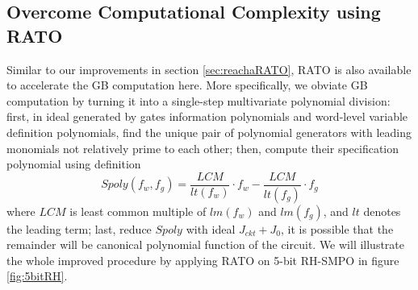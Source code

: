 \subsection{Overcome Computational Complexity using RATO}
Similar to our improvements in section \ref{sec:reachaRATO}, RATO \cite{TimDAC} is also available to 
accelerate the GB computation here. More specifically, we obviate GB computation by turning it 
into a single-step multivariate polynomial division: first, in ideal generated by
gates information polynomials and word-level variable definition polynomials, find the unique pair of polynomial
generators with leading monomials not relatively prime to each other; then, compute their specification polynomial
using definition 
$$Spoly(f_w,f_g) = \frac{LCM}{lt(f_w)}\cdot f_w - \frac{LCM}{lt(f_g)}\cdot f_g$$
where $LCM$ is least common multiple of $lm(f_w)$ and $lm(f_g)$, and $lt$ denotes the leading term;
last, reduce $Spoly$ with ideal $J_{ckt}+J_0$, it is possible that the remainder will be canonical polynomial
function of the circuit. We will illustrate the whole improved procedure by applying RATO on 
5-bit RH-SMPO in figure \ref{fig:5bitRH}.

